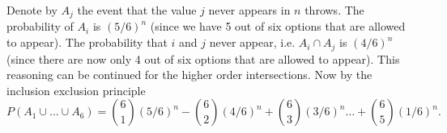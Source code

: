 
\setcounter{theorem}{48}
\begin{exercise}[BH.1.49]
\begin{solution}
	Denote by $A_{j}$ the event that the value $j$ never appears in $n$ throws. The probability of $A_{i}$ is $(5/6)^n$ (since we have 5 out of six options that are allowed to appear). The probability that $i$ and $j$ never appear, i.e. $A_{i}\cap A_{j}$ is $(4/6)^n$ (since there are now only 4 out of six options that are allowed to appear). This reasoning can be continued for the higher order intersections. Now by the inclusion exclusion principle
	$$P(A_{1}\cup\ldots\cup A_{6}) = {6 \choose 1}(5/6)^n - {6 \choose 2}(4/6)^n + {6\choose 3}(3/6)^n\ldots +{6 \choose 5}(1/6)^n.$$ 
 
\end{solution}
\end{exercise}


